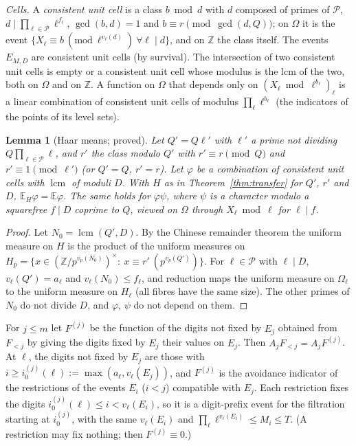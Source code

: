 \documentclass[11pt,reqno]{amsart}
\newtheorem{lemma}[theorem]{Lemma}
\theoremstyle{definition}
\newcommand{\lcm}{\operatorname{lcm}}
\newcommand{\cP}{\mathcal P}
\newcommand{\E}{\mathbb E}
\begin{document}
\emph{Cells.}  A \emph{consistent unit cell} is a class $b\bmod d$ with $d$
composed of primes of $\cP$, $d\mid\prod_{\ell\in\cP}\ell^{f_\ell}$, $\gcd(b,d)=1$ and
$b\equiv r\pmod{\gcd(d,Q)}$; on $\Omega$ it is the event
$\{X_\ell\equiv b\ (\mathrm{mod}\ \ell^{v_\ell(d)})\ \forall\ell\mid d\}$, and on $\mathbb Z$ the
class itself.  The events $E_{M,D}$ are consistent unit cells (by survival).
The intersection of two consistent unit cells is empty or a consistent unit
cell whose modulus is the lcm of the two, both on $\Omega$ and on $\mathbb Z$.
A function on $\Omega$ that depends only on $(X_\ell\bmod\ell^{b_\ell})_\ell$ is a linear
combination of consistent unit cells of modulus $\prod_\ell\ell^{b_\ell}$ (the
indicators of the points of its level sets).

\begin{lemma}[Haar means; proved]\label{lem:haar}
Let $Q'=Q\ell'$ with $\ell'$ a prime not dividing $Q\prod_{\ell\in\cP}\ell$, and $r'$
the class modulo $Q'$ with $r'\equiv r\pmod Q$ and $r'\equiv1\pmod{\ell'}$ (or
$Q'=Q$, $r'=r$).  Let $\varphi$ be a combination of consistent unit cells with
$\lcm$ of moduli $D$.  With $H$ as in Theorem~\ref{thm:transfer} for $Q'$,
$r'$ and $D$, $\E_H\varphi=\E\varphi$.  The same holds for $\varphi\psi$, where $\psi$
is a character modulo a squarefree $f\mid D$ coprime to $Q$, viewed on $\Omega$
through $X_\ell\bmod\ell$ for $\ell\mid f$.
\end{lemma}

\begin{proof}
Let $N_0=\lcm(Q',D)$.  By the Chinese remainder theorem the uniform measure on
$H$ is the product of the uniform measures on
$H_p=\{x\in(\mathbb Z/p^{v_p(N_0)})^\times:\ x\equiv r'\ (p^{v_p(Q')})\}$.  For $\ell\in\cP$ with
$\ell\mid D$, $v_\ell(Q')=a_\ell$ and $v_\ell(N_0)\le f_\ell$, and reduction maps the uniform
measure on $\Omega_\ell$ to the uniform measure on $H_\ell$ (all fibres have the
same size).  The other primes of $N_0$ do not divide $D$, and $\varphi$, $\psi$ do
not depend on them.
\end{proof}

For $j\le m$ let $F^{(j)}$ be the function of the digits not fixed by $E_j$
obtained from $F_{<j}$ by giving the digits fixed by $E_j$ their values on
$E_j$.  Then $A_jF_{<j}=A_jF^{(j)}$.  At $\ell$, the digits not fixed by $E_j$ are
those with $i\ge i_0^{(j)}(\ell):=\max(a_\ell,v_\ell(E_j))$, and $F^{(j)}$ is the avoidance
indicator of the restrictions of the events $E_i$ ($i<j$) compatible with
$E_j$.  Each restriction fixes the digits $i_0^{(j)}(\ell)\le i<v_\ell(E_i)$, so it is a
digit-prefix event for the filtration starting at $i_0^{(j)}$, with the same
$v_\ell(E_i)$ and $\prod_\ell\ell^{v_\ell(E_i)}\le M_i\le T$.  (A restriction may fix
nothing; then $F^{(j)}\equiv0$.)
\end{document}
